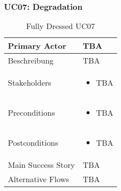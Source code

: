 \subsubsection{UC07: Degradation}
\begin{table}[H]
	\centering
	\begin{tabularx}{\textwidth}{l | X}
		Primary Actor   & TBA        \\
		\hline
		Beschreibung   & TBA  \\ 
		\hline
		Stakeholders       & 
		\begin{itemize}
			\item TBA
		\end{itemize} \\ 
		Preconditions      &
		\begin{itemize}	
			\item TBA
		\end{itemize}  \\
		\hline
		Postconditions     & 
		\begin{itemize}	
			\item TBA
		\end{itemize}  \\
		\hline
		Main Success Story & TBA
		\newline
		\\
		\hline
		Alternative Flows  & 
		TBA \newline
		\newline
	\end{tabularx}
	\caption{Fully Dressed UC07}
	\label{tab:UC07}
\end{table}

